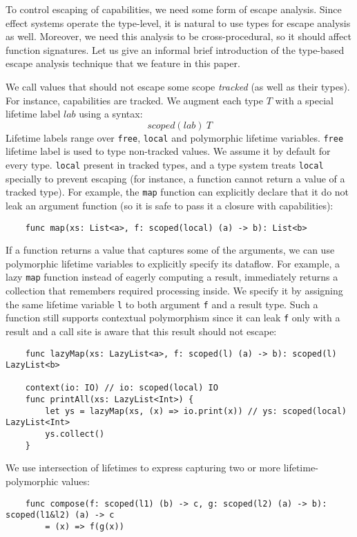 \documentclass[acmsmall]{acmart}
\newcommand{\ap}{~}
\begin{document}
To control escaping of capabilities, we need some form of escape analysis. %
Since effect systems operate the type-level, it is natural to use types for escape analysis as well.
Moreover, we need this analysis to be cross-procedural, so it should affect function signatures.
Let us give an informal brief introduction of the type-based escape analysis technique that we feature in this paper.

We call values that should not escape some scope \textit{tracked} (as well as their types).
For instance, capabilities are tracked.
We augment each type $T$ with a special lifetime label $lab$ using a syntax: \[scoped(lab)\ap T\]
Lifetime labels range over \texttt{free}, \texttt{local} and polymorphic lifetime variables.
\texttt{free} lifetime label is used to type non-tracked values.
We assume it by default for every type.
\texttt{local} present in tracked types, and a type system treats \texttt{local} specially to prevent escaping (for instance, a function cannot return a value of a tracked type).
For example, the \texttt{map} function can explicitly declare that it do not leak an argument function (so it is safe to pass it a closure with capabilities):
\begin{verbatim}
    func map(xs: List<a>, f: scoped(local) (a) -> b): List<b>
\end{verbatim}

If a function returns a value that captures some of the arguments, we can use polymorphic lifetime variables to explicitly specify its dataflow.
For example, a lazy \texttt{map} function instead of eagerly computing a result, immediately returns a collection that remembers required processing inside.
We specify it by assigning the same lifetime variable \texttt{l} to both argument \texttt{f} and a result type.
Such a function still supports contextual polymorphism since it can leak \texttt{f} only with a result and a call site is aware that this result should not escape:
\begin{verbatim}
    func lazyMap(xs: LazyList<a>, f: scoped(l) (a) -> b): scoped(l) LazyList<b>

    context(io: IO) // io: scoped(local) IO
    func printAll(xs: LazyList<Int>) {
        let ys = lazyMap(xs, (x) => io.print(x)) // ys: scoped(local) LazyList<Int>
        ys.collect()
    }
\end{verbatim}

We use intersection of lifetimes to express capturing two or more lifetime-polymorphic values:
\begin{verbatim}
    func compose(f: scoped(l1) (b) -> c, g: scoped(l2) (a) -> b): scoped(l1&l2) (a) -> c
        = (x) => f(g(x))
\end{verbatim}
\end{document}
